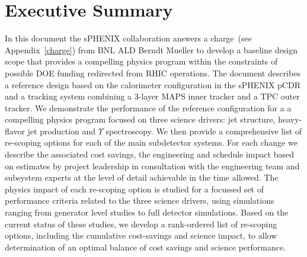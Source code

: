\section*{Executive Summary}
\label{executive_summary}
\setcounter{page}{1}

\nocite{*}

In this document the sPHENIX collaboration answers a charge~(see
Appendix~\ref{charge}) from BNL ALD Berndt Mueller to develop
a baseline design scope that provides a compelling physics program
within the constraints of possible DOE funding redirected from 
RHIC operations. The document describes a reference design based
on the calorimeter configuration in the sPHENIX pCDR and a tracking system
combining a 3-layer MAPS inner tracker and a TPC outer tracker. We
demonstrate the performance of the reference configuration for a
a compelling physics program focused on three science drivers: jet structure,
heavy-flavor jet production and $\Upsilon$ spectroscopy. 
We then provide a comprehensive list of re-scoping options for each
of the main subdetector systems. For each change we describe the associated
cost savings, the engineering and schedule impact 
based on estimates by project leadership in consultation with the 
engineering team and subsystem experts
at the level of detail achievable in the time allowed. 
The physics impact of each re-scoping option is studied for a focussed set of performance criteria
related to the three science drivers, using simulations ranging from
generator level studies to full detector simulations. Based on the 
current status of these studies, we develop a 
rank-ordered list of re-scoping options, including the 
cumulative cost-savings and science impact, to allow determination
of an optimal balance of cost savings and science performance.


